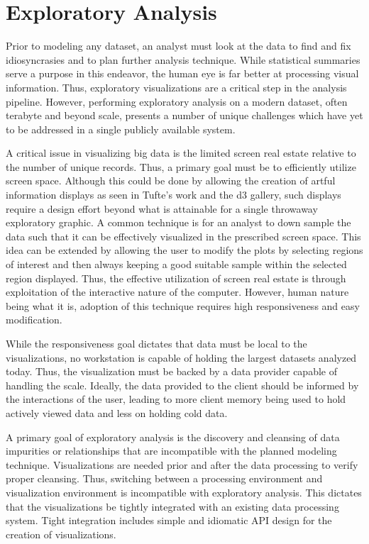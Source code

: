 \documentclass[letter,twocolumn]{article}
\begin{document}
\section{Exploratory Analysis}

Prior to modeling any dataset, an analyst must look at the data to find and fix idiosyncrasies and to plan further analysis technique.
While statistical summaries serve a purpose in this endeavor, the human eye is far better at processing visual information.
Thus, exploratory visualizations are a critical step in the analysis pipeline.
However, performing exploratory analysis on a modern dataset, often terabyte and beyond scale, presents a number of unique challenges which have yet to be addressed in a single publicly available system.

A critical issue in visualizing big data is the limited screen real estate relative to the number of unique records.
Thus, a primary goal must be to efficiently utilize screen space.
Although this could be done by allowing the creation of artful information displays as seen in Tufte's work\cite{Tufte:1986:VDQ:33404} and the d3 gallery\cite{d3galery}, such displays require a design effort beyond what is attainable for a single throwaway exploratory graphic.
A common technique is for an analyst to down sample the data such that it can be effectively visualized in the prescribed screen space.  
This idea can be extended by allowing the user to modify the plots by selecting regions of interest and then always keeping a good suitable sample within the selected region displayed.  
Thus, the effective utilization of screen real estate is through exploitation of the interactive nature of the computer.
However, human nature being what it is, adoption of this technique requires high responsiveness and easy modification.

While the responsiveness goal dictates that data must be local to the visualizations, no workstation is capable of holding the largest datasets analyzed today.
Thus, the visualization must be backed by a data provider capable of handling the scale.
Ideally, the data provided to the client should be informed by the interactions of the user, leading to more client memory being used to hold actively viewed data and less on holding cold data.

A primary goal of exploratory analysis is the discovery and cleansing of data impurities or relationships that are incompatible with the planned modeling technique.
Visualizations are needed prior and after the data processing to verify proper cleansing.
Thus, switching between a processing environment and visualization environment is incompatible with exploratory analysis.
This dictates that the visualizations be tightly integrated with an existing data processing system.
Tight integration includes simple and idiomatic API design for the creation of visualizations.
\end{document}
